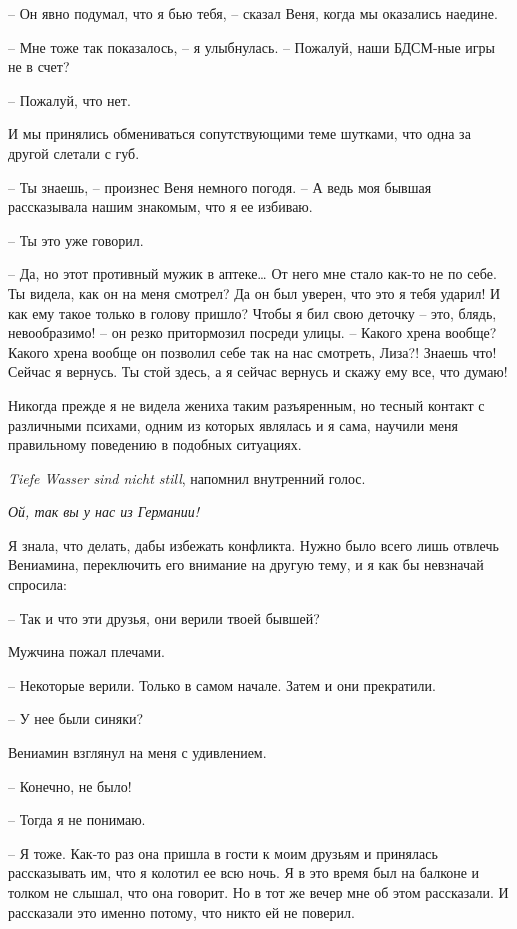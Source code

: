 \documentclass[
]{book}
\begin{document}
-- Он явно подумал, что я бью тебя, -- сказал Веня, когда мы оказались наедине.

-- Мне тоже так показалось, -- я улыбнулась. -- Пожалуй, наши БДСМ-ные игры не в счет?

-- Пожалуй, что нет.

И мы принялись обмениваться сопутствующими теме шутками, что одна за другой слетали с губ.

-- Ты знаешь, -- произнес Веня немного погодя. -- А ведь моя бывшая рассказывала нашим знакомым, что я ее избиваю.

-- Ты это уже говорил.

-- Да, но этот противный мужик в аптеке\ldots{} От него мне стало как-то не по себе. Ты видела, как он на меня смотрел? Да он был уверен, что это я тебя ударил! И как ему такое только в голову пришло? Чтобы я бил свою деточку -- это, блядь, невообразимо! -- он резко притормозил посреди улицы. -- Какого хрена вообще? Какого хрена вообще он позволил себе так на нас смотреть, Лиза?! Знаешь что! Сейчас я вернусь. Ты стой здесь, а я сейчас вернусь и скажу ему все, что думаю!

Никогда прежде я не видела жениха таким разъяренным, но тесный контакт с различными психами, одним из которых являлась и я сама, научили меня правильному поведению в подобных ситуациях.

\emph{Tiefe Wasser sind nicht still}, напомнил внутренний голос.

\emph{Ой, так вы у нас из Германии!}

Я знала, что делать, дабы избежать конфликта. Нужно было всего лишь отвлечь Вениамина, переключить его внимание на другую тему, и я как бы невзначай спросила:

-- Так и что эти друзья, они верили твоей бывшей?

Мужчина пожал плечами.

-- Некоторые верили. Только в самом начале. Затем и они прекратили.

-- У нее были синяки?

Вениамин взглянул на меня с удивлением.

-- Конечно, не было!

-- Тогда я не понимаю.

-- Я тоже. Как-то раз она пришла в гости к моим друзьям и принялась рассказывать им, что я колотил ее всю ночь. Я в это время был на балконе и толком не слышал, что она говорит. Но в тот же вечер мне об этом рассказали. И рассказали это именно потому, что никто ей не поверил.
\end{document}
